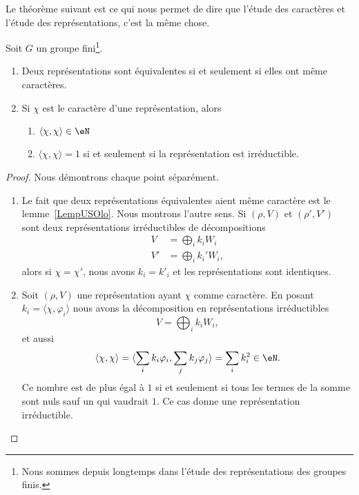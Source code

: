 Le théorème suivant est ce qui nous permet de dire que l'étude des caractères et l'étude des représentations, c'est la même chose.

\begin{theorem} \label{ThoWGkfADd}
	Soit \( G\) un groupe fini\footnote{Nous sommes depuis longtemps dans l'étude des représentations des groupes finis.}.
	\begin{enumerate}
		\item   \label{ItemZReOWoHi}
		      Deux représentations sont équivalentes si et seulement si elles ont même caractères.
		\item   \label{ItemZReOWoHii}
		      Si \( \chi\) est le caractère d'une représentation, alors
		      \begin{enumerate}
			      \item
			            \( \langle \chi, \chi\rangle \in \eN\)
			      \item
			            \( \langle \chi, \chi\rangle =1\) si et seulement si la représentation est irréductible.
		      \end{enumerate}
	\end{enumerate}
\end{theorem}

\begin{proof}
	Nous démontrons chaque point séparément.
	\begin{enumerate}
		\item

		      Le fait que deux représentations équivalentes aient même caractère est le lemme~\ref{LempUSOlo}. Nous montrons l'autre sens. Si \( (\rho,V)\) et \( (\rho',V')\) sont deux représentations irréductibles de décompositions
		      \begin{subequations}
			      \begin{align}
				      V  & =\bigoplus_ik_iW_i   \\
				      V' & =\bigoplus_ik_i'W_i,
			      \end{align}
		      \end{subequations}
		      alors si \( \chi=\chi'\), nous avons \( k_i=k'_i\) et les représentations sont identiques.

		\item

		      Soit \( (\rho,V)\) une représentation ayant \( \chi\) comme caractère. En posant \( k_i=\langle \chi, \varphi_i\rangle \) nous avons la décomposition en représentations irréductibles
		      \begin{equation}
			      V=\bigoplus_ik_iW_i,
		      \end{equation}
		      et aussi
		      \begin{equation}
			      \langle \chi, \chi\rangle =\langle \sum_ik_i\varphi_i, \sum_jk_j\varphi_j\rangle =\sum_ik_i^2\in \eN.
		      \end{equation}
		      Ce nombre est de plus égal à \( 1\) si et seulement si tous les termes de la somme sont nuls sauf un qui vaudrait \( 1\). Ce cas donne une représentation irréductible.
	\end{enumerate}
\end{proof}

